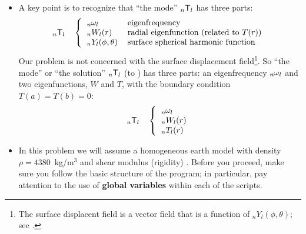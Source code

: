 \documentclass[11pt,titlepage,fleqn]{article}
\newcommand{\tnl}[2]{\mbox{$_{#1}\ssT_{#2}$}}
\newcommand{\Tnl}{\mbox{${}_nT_l$}}   %
\newcommand{\Wnl}{\mbox{${}_nW_l$}}   %
\newcommand{\Ynl}{\mbox{${}_nY_l$}}   %
\newcommand{\omnl}{\mbox{${}_{n\hspace{-0.2 mm}}\omega_l$}}  %
\begin{document}
\begin{itemize}
\item A key point is to recognize that ``the mode'' \tnl{n}{l} has three parts:
%
\begin{equation}
\tnl{n}{l} \hspace{10pt} \left\{
\begin{tabular}{ll}
$\omnl$ & eigenfrequency \\
$\Wnl(r)$ & radial eigenfunction (related to $T(r)$) \\
$\Ynl(\phi,\theta)$ & surface spherical harmonic function
\end{tabular} \right.
\end{equation}
%
Our problem is not concerned with the surface displacement field\footnote{The surface displacent field is a vector field that is a function of $\Ynl(\phi,\theta)$; see \citet[][Section 8.6.1]{DT}.}.
So ``the mode'' or ``the solution'' \tnl{n}{l} (to ) has three parts: an eigenfrequency $\omnl$ and two eigenfunctions, $W$ and $T$, with the boundary condition $T(a) = T(b) = 0$:
%
\begin{equation}
\tnl{n}{l} \hspace{10pt} \left\{
\begin{tabular}{ll}
$\omnl$  \\
$\Wnl(r)$ \\
$\Tnl(r)$ 
\end{tabular} \right.
\end{equation}
%

\item In this problem we will assume a homogeneous earth model with density $\rho = 4380$~kg/m$^3$ and shear modulus (rigidity) . Before you proceed, make sure you follow the basic structure of the program; in particular, pay attention to the use of {\bf global variables} within each of the scripts.
\end{itemize}
\end{document}
